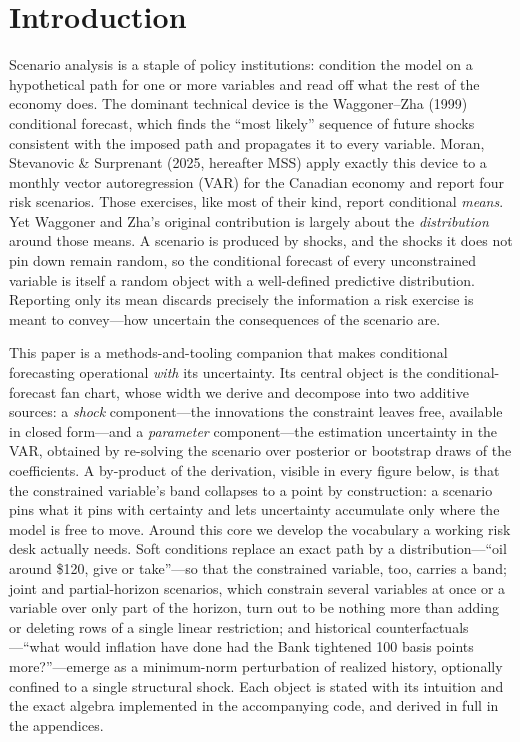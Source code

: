 \documentclass[11pt]{article}
\theoremstyle{remark}
\begin{document}
\section{Introduction}
Scenario analysis is a staple of policy institutions: condition the model on a
hypothetical path for one or more variables and read off what the rest of the
economy does. The dominant technical device is the Waggoner--Zha (1999)
conditional forecast, which finds the ``most likely'' sequence of future shocks
consistent with the imposed path and propagates it to every variable. Moran,
Stevanovic \& Surprenant (2025, hereafter MSS) apply exactly this device to a
monthly vector autoregression (VAR) for the Canadian economy and report four risk
scenarios. Those exercises, like most of their kind, report conditional
\emph{means}. Yet Waggoner and Zha's original contribution is largely about the
\emph{distribution} around those means. A scenario is produced by shocks, and the
shocks it does not pin down remain random, so the conditional forecast of every
unconstrained variable is itself a random object with a well-defined predictive
distribution. Reporting only its mean discards precisely the information a risk
exercise is meant to convey---how uncertain the consequences of the scenario are.

This paper is a methods-and-tooling companion that makes conditional forecasting
operational \emph{with} its uncertainty. Its central object is the
conditional-forecast fan chart, whose width we derive and decompose into two
additive sources: a \emph{shock} component---the innovations the constraint
leaves free, available in closed form---and a \emph{parameter} component---the
estimation uncertainty in the VAR, obtained by re-solving the scenario over
posterior or bootstrap draws of the coefficients. A by-product of the derivation,
visible in every figure below, is that the constrained variable's band collapses
to a point by construction: a scenario pins what it pins with certainty and lets
uncertainty accumulate only where the model is free to move. Around this core we
develop the vocabulary a working risk desk actually needs. Soft conditions
replace an exact path by a distribution---``oil around \$120, give or take''---so
that the constrained variable, too, carries a band; joint and partial-horizon
scenarios, which constrain several variables at once or a variable over only part
of the horizon, turn out to be nothing more than adding or deleting rows of a
single linear restriction; and historical counterfactuals---``what would
inflation have done had the Bank tightened 100 basis points more?''---emerge as a
minimum-norm perturbation of realized history, optionally confined to a single
structural shock. Each object is stated with its intuition and the exact algebra
implemented in the accompanying code, and derived in full in the appendices.
\end{document}

